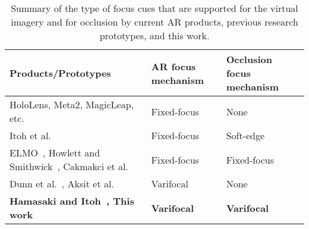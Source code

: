 \renewcommand{\arraystretch}{1.2}
\begin{table}
    \begin{center}
\begin{tabular}{|>{\centering\arraybackslash}m{6cm}|>{\centering\arraybackslash}m{2.0cm}|>{\centering\arraybackslash}m{2.5cm}|}
\hline
Products/Prototypes & AR focus mechanism & Occlusion focus mechanism \\
\hline
HoloLens, Meta2, MagicLeap, etc. & Fixed-focus & None \\
\hline
Itoh et al.\cite{Itoh2017} & Fixed-focus & Soft-edge \\
\hline
ELMO~\cite{Kiyokawa2003}, Howlett and Smithwick~\cite{Howlett2017}, Cakmakci et al.~\cite{Cakmakci2004} & Fixed-focus & Fixed-focus \\
\hline
Dunn et al.~\cite{Dunn2017Wide}, Aksit et al.~\cite{Aksit2017Near} & Varifocal & None \\
\hline
\textbf{Hamasaki and Itoh~\cite{Hamasaki2019}, This work} & \textbf{Varifocal} & \textbf{Varifocal} \\
\hline
\end{tabular}
    \end{center}
\caption[Varifocal-Occlusion NED: comparison of focus mechanisms for virtual imagery and occlusion mask in AR displays]{Summary of the type of focus cues that are supported for the virtual imagery and for occlusion by current AR products, previous research prototypes, and this work.}
\label{tab:comparison}
\end{table}
